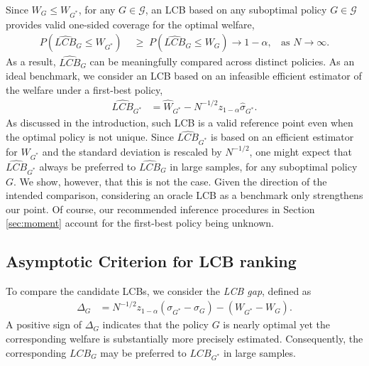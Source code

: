 \documentclass[12pt]{article}
\numberwithin{equation}{section}
\theoremstyle{plain}                         %
\theoremstyle{definition}                  %
\theoremstyle{remark}                      %
\begin{document}
Since $W_{G} \leq W_{G^*}$, for any $G \in \mathcal{G}$, an LCB based on any suboptimal policy $G \in \mathcal{G}$ provides valid one-sided coverage for the optimal welfare, 
\begin{align}
\label{eq:lcbvalid}
P(\widehat{LCB}_G \le W_{G^*})
  \;&\ge\;P(\widehat{LCB}_G\le W_G)\to1-\alpha, \;\;\text{ as } N \rightarrow \infty.
\end{align}
As a result, $\widehat{LCB}_{G}$ can be meaningfully compared across distinct policies. As an ideal benchmark, we consider an LCB based on an infeasible efficient estimator of the welfare under a first-best policy, 
 \begin{align}
\widehat{LCB}_{G^{*}} &= \widehat{W}_{G^{*}} - N^{-1/2} z_{1-\alpha}\widehat{\sigma}_{G^{*}}. \label{eq:lcbg2} 
\end{align}
As discussed in the introduction, such LCB is a valid reference point even when the optimal policy is not unique. Since $\widehat{LCB}_{G^*}$ is based on an efficient estimator for $W_{G^*}$ and the standard deviation is rescaled by $N^{-1/2}$, one might expect that $\widehat{LCB}_{G^{*}}$ always be preferred to $\widehat{LCB}_{G}$ in large samples, for any suboptimal policy $G$. We show, however, that this is not the case. Given the direction of the intended comparison, considering an oracle LCB as a benchmark only strengthens our point. Of course, our recommended inference procedures in Section \ref{sec:moment} account for the first-best policy being unknown.

\subsection{Asymptotic Criterion for LCB ranking }
\label{sec:lcbgap}

To compare the candidate LCBs, we consider the \textit{LCB gap}, defined as
\begin{align}
\label{eq:deltag}
\Delta_G &= N^{-1/2} z_{1-\alpha} (\sigma_{G^{*}}-\sigma_G)  -(W_{G^{*}} - W_G).
\end{align}
A positive sign of $\Delta_G$ indicates that the policy $G$ is nearly optimal yet the corresponding welfare is substantially more precisely estimated. Consequently, the corresponding ${LCB}_{G}$ may be preferred to ${LCB}_{G^{*}}$ in large samples. 
\end{document}
